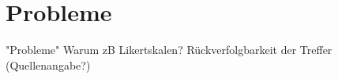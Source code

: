 \section{Probleme}
"Probleme"
Warum zB Likertskalen? 
Rückverfolgbarkeit der Treffer (Quellenangabe?)